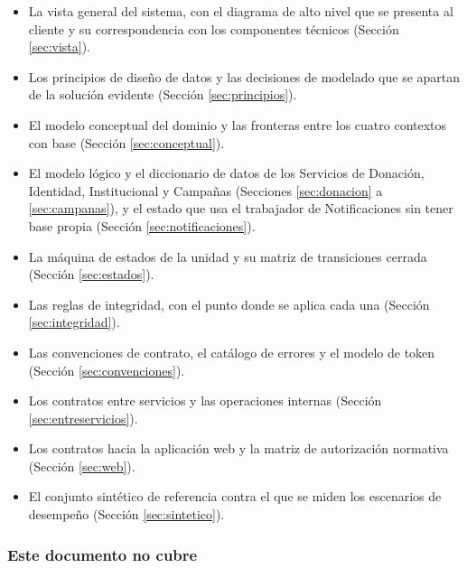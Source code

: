 \documentclass[11pt,a4paper]{article}
\begin{document}
\begin{itemize}
\item La vista general del sistema, con el diagrama de alto nivel que se presenta al cliente y su correspondencia con los componentes técnicos (Sección \ref{sec:vista}).
\item Los principios de diseño de datos y las decisiones de modelado que se apartan de la solución evidente (Sección \ref{sec:principios}).
\item El modelo conceptual del dominio y las fronteras entre los cuatro contextos con base (Sección \ref{sec:conceptual}).
\item El modelo lógico y el diccionario de datos de los Servicios de Donación, Identidad, Institucional y Campañas (Secciones \ref{sec:donacion} a \ref{sec:campanas}), y el estado que usa el trabajador de Notificaciones sin tener base propia (Sección \ref{sec:notificaciones}).
\item La máquina de estados de la unidad y su matriz de transiciones cerrada (Sección \ref{sec:estados}).
\item Las reglas de integridad, con el punto donde se aplica cada una (Sección \ref{sec:integridad}).
\item Las convenciones de contrato, el catálogo de errores y el modelo de token (Sección \ref{sec:convenciones}).
\item Los contratos entre servicios y las operaciones internas (Sección \ref{sec:entreservicios}).
\item Los contratos hacia la aplicación web y la matriz de autorización normativa (Sección \ref{sec:web}).
\item El conjunto sintético de referencia contra el que se miden los escenarios de desempeño (Sección \ref{sec:sintetico}).
\end{itemize}

\subsubsection*{Este documento no cubre}
\end{document}
